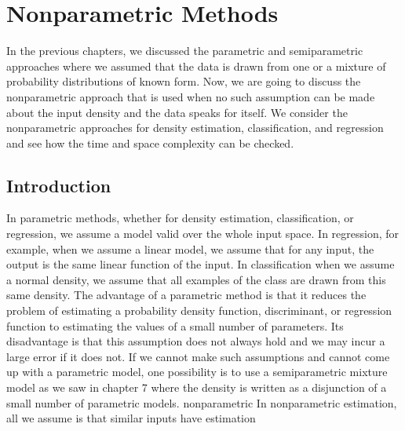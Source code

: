 \chapter{Nonparametric Methods}
\label{chap:08-nonparametric-methods}

In the previous chapters, we discussed the parametric and semiparametric approaches where we assumed that the data is drawn from one or a mixture of probability distributions of known form. Now, we are going to discuss the nonparametric approach that is used when no such assumption can be made about the input density and the data speaks for itself. We consider the nonparametric approaches for density estimation, classification, and regression and see how the time and space complexity can be checked.

\section{Introduction}

In parametric methods, whether for density estimation, classification, or regression, we assume a model valid over the whole input space. In regression, for example, when we assume a linear model, we assume that for any input, the output is the same linear function of the input. In classification when we assume a normal density, we assume that all examples of the class are drawn from this same density. The advantage of a parametric method is that it reduces the problem of estimating a probability density function, discriminant, or regression function to estimating the values of a small number of parameters. Its disadvantage is that this assumption does not always hold and we may incur a large error if it does not. If we cannot make such assumptions and cannot come up with a parametric model, one possibility is to use a semiparametric mixture model as we saw in chapter 7 where the density is written as a disjunction of a small number of parametric models. nonparametric In nonparametric estimation, all we assume is that similar inputs have estimation


